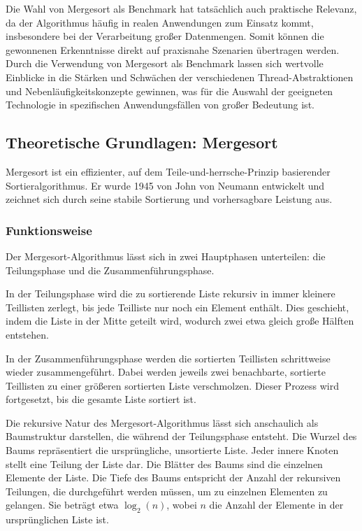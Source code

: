 \documentclass[fontsize=12pt,paper=a4,twoside=semi,parskip=half-,headsepline,headinclude]{scrreprt}
\begin{document}
Die Wahl von Mergesort als Benchmark hat tatsächlich auch praktische Relevanz, da der Algorithmus häufig in realen Anwendungen zum Einsatz kommt, insbesondere bei der Verarbeitung großer Datenmengen. Somit können die gewonnenen Erkenntnisse direkt auf praxisnahe Szenarien übertragen werden. Durch die Verwendung von Mergesort als Benchmark lassen sich wertvolle Einblicke in die Stärken und Schwächen der verschiedenen Thread-Abstraktionen und Nebenläufigkeitskonzepte gewinnen, was für die Auswahl der geeigneten Technologie in spezifischen Anwendungsfällen von großer Bedeutung ist.

\subsection{Theoretische Grundlagen: Mergesort}

Mergesort ist ein effizienter, auf dem Teile-und-herrsche-Prinzip basierender Sortieralgorithmus. Er wurde 1945 von John von Neumann entwickelt \cite{vonNeumann1945} und zeichnet sich durch seine stabile Sortierung und vorhersagbare Leistung aus.

\subsubsection{Funktionsweise}

Der Mergesort-Algorithmus lässt sich in zwei Hauptphasen unterteilen: die Teilungsphase und die Zusammenführungsphase.

In der Teilungsphase wird die zu sortierende Liste rekursiv in immer kleinere Teillisten zerlegt, bis jede Teilliste nur noch ein Element enthält. Dies geschieht, indem die Liste in der Mitte geteilt wird, wodurch zwei etwa gleich große Hälften entstehen.

In der Zusammenführungsphase werden die sortierten Teillisten schrittweise wieder zusammengeführt. Dabei werden jeweils zwei benachbarte, sortierte Teillisten zu einer größeren sortierten Liste verschmolzen. Dieser Prozess wird fortgesetzt, bis die gesamte Liste sortiert ist.

Die rekursive Natur des Mergesort-Algorithmus lässt sich anschaulich als Baumstruktur darstellen, die während der Teilungsphase entsteht. Die Wurzel des Baums repräsentiert die ursprüngliche, unsortierte Liste. Jeder innere Knoten stellt eine Teilung der Liste dar. Die Blätter des Baums sind die einzelnen Elemente der Liste. Die Tiefe des Baums entspricht der Anzahl der rekursiven Teilungen, die durchgeführt werden müssen, um zu einzelnen Elementen zu gelangen. Sie beträgt etwa $\log_2(n)$, wobei $n$ die Anzahl der Elemente in der ursprünglichen Liste ist.
\end{document}
